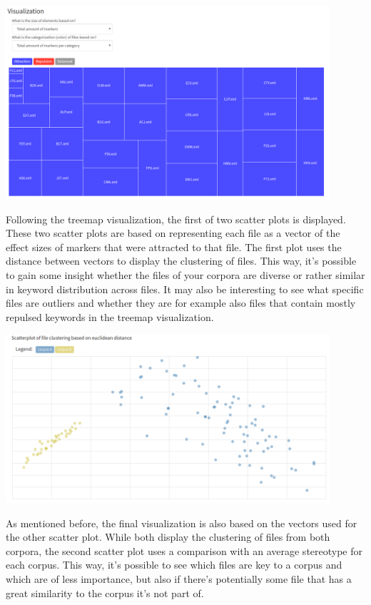 \documentclass[11pt,a4paper]{article}
\begin{document}
\centerline{\includegraphics[width=0.9\textwidth]{images/treemap.png}}

Following the treemap visualization, the first of two scatter plots is displayed. These two scatter plots are based on representing each file as a vector of the effect sizes of markers that were attracted to that file. The first plot uses the distance between vectors to display the clustering of files. This way, it's possible to gain some insight whether the files of your corpora are diverse or rather similar in keyword distribution across files. It may also be interesting to see what specific files are outliers and whether they are for example also files that contain mostly repulsed keywords in the treemap visualization.

\centerline{\includegraphics[width=0.9\textwidth]{images/euclid.png}}

As mentioned before, the final visualization is also based on the vectors used for the other scatter plot. While both display the clustering of files from both corpora, the second scatter plot uses a comparison with an average stereotype for each corpus. This way, it's possible to see which files are key to a corpus and which are of less importance, but also if there's potentially some file that has a great similarity to the corpus it's not part of.
\end{document}

